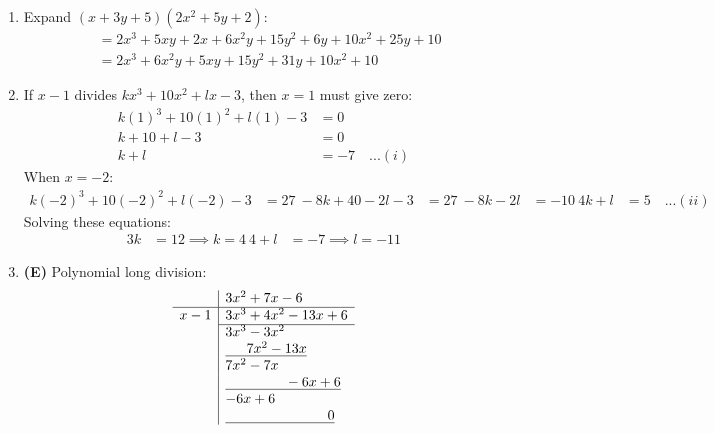 \begin{multicols}{2}
\begin{enumerate}[label={\textbf{\arabic*.}}]
    \item Expand $(x + 3y + 5)(2x^2 + 5y + 2)$:
      \begin{align*}
        &= 2x^3 + 5xy + 2x + 6x^2y + 15y^2 + 6y + 10x^2 + 25y + 10 \\
        &= 2x^3 + 6x^2y + 5xy + 15y^2 + 31y + 10x^2 + 10
      \end{align*}
    \item If $x-1$ divides $kx^3 + 10x^2 + lx - 3$, then $x = 1$ must give zero:
      \begin{align*}
        k(1)^3 + 10(1)^2 + l(1) - 3 &= 0 \\
        k + 10 + l - 3 &= 0 \\
        k + l &= -7 \quad ...(i)
      \end{align*}
      When $x = -2$:
      \begin{align*}
        k(-2)^3 + 10(-2)^2 + l(-2) - 3 &= 27 \
        -8k + 40 - 2l - 3 &= 27 \
        -8k - 2l &= -10 \
        4k + l &= 5 \quad ...(ii)
      \end{align*}
      Solving these equations:
      \begin{align*}
        3k &= 12 \implies k = 4 \
        4 + l &= -7 \implies l = -11
      \end{align*}

    \item \textbf{(E)} Polynomial long division:
      \[
        \begin{array}{r|l}
          & 3x^2 + 7x - 6 \\
          \hline
          x-1 & 3x^3 + 4x^2 - 13x + 6 \\
          \cline{2-2}
          & 3x^3 - 3x^2 \\
          & \underline{\phantom{3x^3} 7x^2 - 13x} \\
          & 7x^2 - 7x \\
          & \underline{\phantom{3x^3 + 7x^2} -6x + 6} \\
          & -6x + 6 \\
          & \underline{\phantom{3x^3 + 7x^2 - 6x +} 0}
        \end{array}
      \]


\end{enumerate}
\end{multicols}

